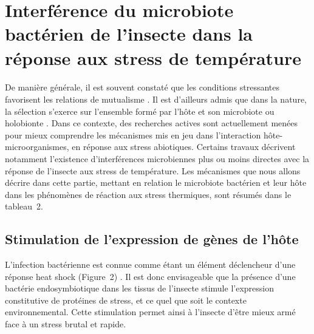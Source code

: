 \section[Interférences du microbiote de l'insecte dans la réponse aux stress de température]%
{Interférence du microbiote bactérien de l'insecte dans la réponse aux stress de température} 

\paragraph*{}
De manière générale, il est souvent constaté que les conditions stressantes favorisent les relations de mutualisme \cite{meadows2013}.
Il est d'ailleurs admis que dans la nature, la sélection s'exerce sur l'ensemble formé par l'hôte et son microbiote ou holobionte \cite{rosenberg2008}.
Dans ce contexte, des recherches actives sont actuellement menées pour mieux comprendre les mécanismes mis en jeu dans l'interaction hôte-microorganismes, en réponse aux stress abiotiques.
Certains travaux décrivent notamment l'existence d'interférences microbiennes plus ou moins directes avec la réponse de l'insecte aux stress de température.
Les mécanismes que nous allons décrire dans cette partie, mettant en relation le microbiote bactérien et leur hôte dans les phénomènes de réaction aux stress thermiques, sont résumés dans le tableau~2.

\subsection{Stimulation de l'expression de gènes de l'hôte}

L'infection bactérienne est connue comme étant un élément déclencheur d'une réponse heat shock (Figure~2) \cite{sorensen2003}.
Il est donc envisageable que la présence d'une bactérie endosymbiotique dans les tissus de l'insecte stimule l'expression constitutive de protéines de stress, et ce quel que soit le contexte environnemental.
Cette stimulation permet ainsi à l'insecte d'être mieux armé face à un stress brutal et rapide.


